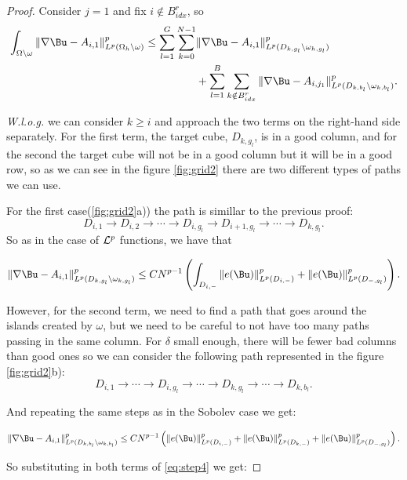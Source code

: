 \begin{proof}
    Consider $j= 1$ and fix $i\notin B^r_{idx}$, so
    \begin{align}\label{eq:step4}
    \int_{\Omega\backslash\omega }\|\nabla \Bu- A_{i,1}\|^p_{L^p(\Omega_h\backslash \omega)} \leq \sum_{l=1}^G\sum_{k=0}^{N-1}&\|\nabla \Bu- A_{i,1}\|^p_{L^p(D_{k,g_l}\backslash \omega_{h,g_l})}\\&+\sum_{l=1}^B\sum_{k\notin B^r_{idx}}\|\nabla \Bu- A_{i,j_1}\|^p_{L^p(D_{k,b_l}\backslash \omega_{k,b_l})}.
    \end{align}
    
    \textit{W.l.o.g.} we can consider $k\geq i$ and approach the two terms on the right-hand side separately. For the first term, the target cube, $D_{k,g_l}$,  is in a good column, and for the second the target cube will not be in a good column but it will be in a good row, so as we can see in the figure \ref{fig:grid2} there are two different types of paths we can use.
    
    For the first case(\ref{fig:grid2}a)) the path is simillar to the previous proof:
        $$D_{i,1}\to D_{i,2}\to\cdots\to D_{i,g_l}\to D_{i+1,g_l}\to\cdots\to D_{k,g_l}.$$
    So as in the case of ${\mathcal L}^p$ functions,  we have that 

    $$\|\nabla \Bu- A_{i,1}\|^p_{L^p(D_{k,g_l}\backslash \omega_{k,g_l})}\leq C N^{p-1}\left(\int_{D_{i,-}}\|e(\Bu)\|^p_{L^p(D_{i,-})}+\|e(\Bu)\|^p_{L^p(D_{-,g_l})}\right).$$
    
    However, for the second term,  we need to find a path that goes around the islands created by $\omega$, but we need to be careful to not have too many paths passing in the same column. For  $\delta$ small enough, there will be fewer bad columns than good ones so we can consider the following path represented in the figure \ref{fig:grid2}b):
    $$D_{i,1}\to\cdots\to D_{i,g_l}\to\cdots\to D_{k,g_l}\to\cdots\to D_{k,b_l}.$$
    
    And repeating the same steps as in the Sobolev case we get:
    
    $$\|\nabla \Bu- A_{i,1}\|^p_{L^p(D_{k,b_l}\backslash \omega_{k,b_l})}\leq C N^{p-1}\left(\|e(\Bu)\|^p_{L^p(D_{i,-})}+\|e(\Bu)\|^p_{L^p(D_{k,-})}+\|e(\Bu)\|^p_{L^p(D_{-,g_l})}\right).$$
    
    So substituting in both terms of \ref{eq:step4} we get:


\end{proof}
